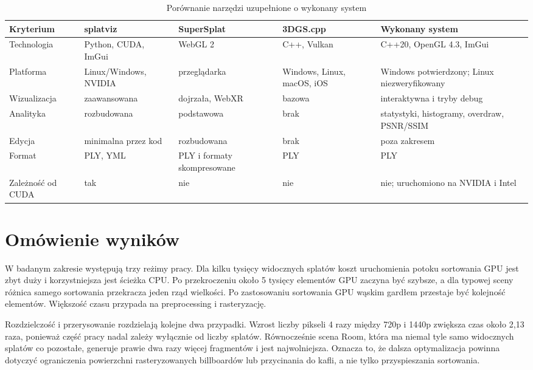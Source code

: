\begin{table}[htbp]
  \centering
  \caption{Porównanie narzędzi uzupełnione o wykonany system}
  \label{tab:porownanie_wynik}
  \scriptsize
  \renewcommand{\arraystretch}{1.15}
  \begin{tabularx}{\textwidth}{
      >{\raggedright\arraybackslash}p{}
      >{\raggedright\arraybackslash}X
      >{\raggedright\arraybackslash}X
      >{\raggedright\arraybackslash}X
      >{\raggedright\arraybackslash}X}
    \toprule
    \textbf{Kryterium} & \textbf{splatviz} & \textbf{SuperSplat} & \textbf{3DGS.cpp} & \textbf{Wykonany system} \\
    \midrule
    Technologia & Python, CUDA, ImGui & WebGL 2 & C++, Vulkan & C++20, OpenGL 4.3, ImGui \\
    Platforma & Linux/Windows, NVIDIA & przeglądarka & Windows, Linux, macOS, iOS & Windows potwierdzony; Linux niezweryfikowany \\
    Wizualizacja & zaawansowana & dojrzała, WebXR & bazowa & interaktywna i tryby debug \\
    Analityka & rozbudowana & podstawowa & brak & statystyki, histogramy, overdraw, PSNR/SSIM \\
    Edycja & minimalna przez kod & rozbudowana & brak & poza zakresem \\
    Format & PLY, YML & PLY i formaty skompresowane & PLY & PLY \\
    Zależność od CUDA & tak & nie & nie & nie; uruchomiono na NVIDIA i Intel \\
    \bottomrule
  \end{tabularx}
\end{table}

\section{Omówienie wyników}
\label{sec:omowienie_wynikow}

W badanym zakresie występują trzy reżimy pracy. Dla kilku tysięcy widocznych splatów koszt uruchomienia potoku sortowania GPU jest zbyt duży i korzystniejsza jest ścieżka CPU. Po przekroczeniu około 5 tysięcy elementów GPU zaczyna być szybsze, a dla typowej sceny różnica samego sortowania przekracza jeden rząd wielkości. Po zastosowaniu sortowania GPU wąskim gardłem przestaje być kolejność elementów. Większość czasu przypada na preprocessing i rasteryzację.

Rozdzielczość i przerysowanie rozdzielają kolejne dwa przypadki. Wzrost liczby pikseli 4 razy między 720p i 1440p zwiększa czas około 2,13 raza, ponieważ część pracy nadal zależy wyłącznie od liczby splatów. Równocześnie scena Room, która ma niemal tyle samo widocznych splatów co pozostałe, generuje prawie dwa razy więcej fragmentów i jest najwolniejsza. Oznacza to, że dalsza optymalizacja powinna dotyczyć ograniczenia powierzchni rasteryzowanych billboardów lub przycinania do kafli, a nie tylko przyspieszania sortowania.

